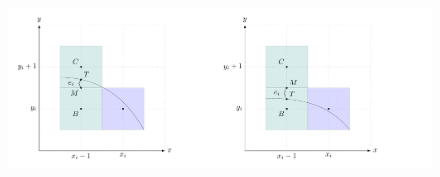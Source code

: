 \begin{solution}
\begin{figure}[hbt]
  \begin{center}
	\includegraphics[scale=1]{Figures/Chapter1/Ellipse/figure4.pdf}
  \end{center}
  \caption{}
\end{figure}

	
\end{solution}
